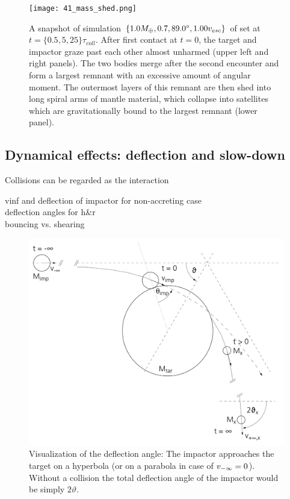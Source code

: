 \begin{figure}[h!]
\begin{center}
\texttt{[image: 41\_mass\_shed.png]}
\caption{A snapshot of simulation $\{ 1.0 M_{\oplus}, 0.7, 89.0 ^\circ, 1.00 v_{esc}\}$ of set \css at $t = \{0.5, 5, 25\} \tau_{coll}$. After first contact at $t = 0$, the target and impactor graze past each other almost unharmed (upper left and right panels). The two bodies merge after the second encounter and form a largest remnant with an excessive amount of angular moment. The outermost layers of this remnant are then shed into long spiral arms of mantle material, which collapse into satellites which are gravitationally bound to the largest remnant (lower panel).}
\label{ch03_fig41}
\end{center}
\end{figure}


\subsection{Dynamical effects: deflection and slow-down}
Collisions can be regarded as the interaction 

vinf and deflection of impactor for non-accreting case\\
deflection angles for h\&r \\
bouncing vs. shearing \\

\begin{figure}
\begin{center}
\includegraphics[scale=0.5]{04_vartheta}
\caption{Visualization of the deflection angle: The impactor approaches the target on a hyperbola (or on a parabola in case of $v_{-\infty} = 0$). Without a collision the total deflection angle of the impactor would be simply $2 \vartheta$.}
\label{ch03_fig02}
\end{center}
\end{figure}


